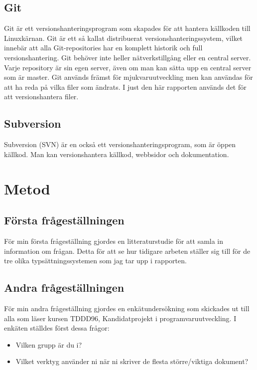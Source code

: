 \subsection{Git}
Git är ett versionshanteringsprogram som skapades för att hantera källkoden till Linuxkärnan. Git är ett så kallat distribuerat versionshanteringssystem, vilket innebär att alla Git-repositories har en komplett historik och full versionshantering. Git behöver inte heller nätverkstillgång eller en central server. Varje repository är sin egen server, även om man kan sätta upp en central server som är master. Git används främst för mjukvaruutveckling men kan användas för att ha reda på vilka filer som ändrats. I just den här rapporten används det för att versionshantera \latex filer.

\subsection{Subversion}
Subversion (SVN) är en också ett versionshanteringsprogram, som är öppen källkod. Man kan versionshantera källkod, webbsidor och dokumentation. 

\section{Metod}
\label{sec:method-tuhkala}

\subsection{Första frågeställningen}
För min första frågeställning gjordes en litteraturstudie för att samla in information om frågan. Detta för att se hur tidigare arbeten ställer sig till för de tre olika typsättningssystemen som jag tar upp i rapporten.

\subsection{Andra frågeställningen}
För min andra frågeställning gjordes en enkätundersökning som skickades ut till alla som läser kursen TDDD96, Kandidatprojekt i programvaruutveckling. I enkäten ställdes först dessa frågor:
\begin{itemize}
	\item Vilken grupp är du i?
	\item Vilket verktyg använder ni när ni skriver de flesta större/viktiga dokument?
\end{itemize}

